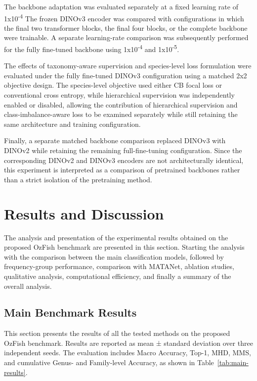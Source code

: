 \documentclass[preprint,12pt]{elsarticle}
\begin{document}
The backbone adaptation was evaluated separately at a fixed learning
rate of 1x10\textsuperscript{-4}\citep{ref51} The
frozen DINOv3 encoder was compared with configurations in which the
final two transformer blocks, the final four blocks, or the complete
backbone were trainable. A separate learning-rate comparison was
subsequently performed for the fully fine-tuned backbone using
1x10\textsuperscript{-4} and 1x10\textsuperscript{-5}.

The effects of taxonomy-aware supervision and species-level loss
formulation were evaluated under the fully fine-tuned DINOv3
configuration using a matched 2x2 objective design. The species-level
objective used either CB focal loss \citep{ref14,ref63} or conventional cross entropy,
while hierarchical supervision \citep{ref24,ref26} was independently enabled or
disabled, allowing the contribution of hierarchical supervision and
class-imbalance-aware loss to be examined separately while still
retaining the same architecture and training configuration.

Finally, a separate matched backbone comparison replaced DINOv3
\citep{ref25} with DINOv2
\citep{ref47} while retaining the remaining
full-fine-tuning configuration. Since the corresponding DINOv2 and
DINOv3 encoders are not architecturally identical, this experiment is
interpreted as a comparison of pretrained backbones rather than a strict
isolation of the pretraining method.

\section{Results and Discussion}\label{results-and-discussion}

The analysis and presentation of the experimental results obtained on
the proposed OzFish benchmark are presented in this section. Starting
the analysis with the comparison between the main classification models,
followed by frequency-group performance, comparison with MATANet,
ablation studies, qualitative analysis, computational efficiency, and
finally a summary of the overall analysis.

\subsection{Main Benchmark Results}\label{main-benchmark-results}

This section presents the results of all the tested methods on the
proposed OzFish benchmark. Results are reported as mean ± standard
deviation over three independent seeds. The evaluation includes Macro
Accuracy, Top-1, MHD, MMS, and cumulative Genus- and Family-level
Accuracy, as shown in Table~\ref{tab:main-results}.
\end{document}
